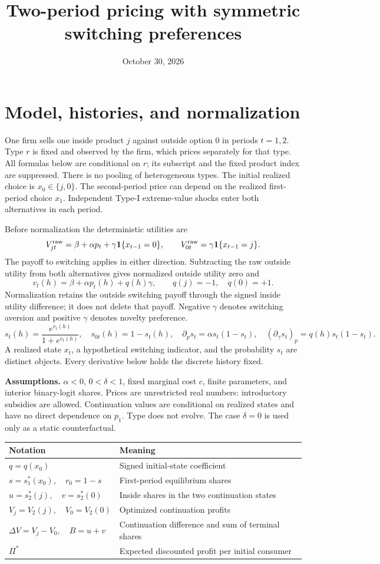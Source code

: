 \documentclass[11pt]{article}
\title{Two-period pricing with symmetric switching preferences}
\author{}\date{October 30, 2026}
\begin{document}
\maketitle
\section{Model, histories, and normalization}
One firm sells one inside product $j$ against outside option $0$ in periods
$t=1,2$. Type $r$ is fixed and observed by the firm, which prices separately for
that type. All formulas below are conditional on $r$; its subscript and the
fixed product index are suppressed. There is no pooling of heterogeneous types.
The initial realized choice is $x_0\in\{j,0\}$. The second-period price can depend
on the realized first-period choice $x_1$. Independent Type-I extreme-value
shocks enter both alternatives in each period.

Before normalization the deterministic utilities are
\[
 V_{jt}^{\rm raw}=\beta+\alpha p_t+\gamma\mathbf1\{x_{t-1}=0\},
 \qquad V_{0t}^{\rm raw}=\gamma\mathbf1\{x_{t-1}=j\}.
\]
The payoff to switching applies in either direction. Subtracting the raw outside
utility from both alternatives gives normalized outside utility zero and
\[
 v_t(h)=\beta+\alpha p_t(h)+q(h)\gamma,\qquad
 q(j)=-1,\quad q(0)=+1.
\]
Normalization retains the outside switching payoff through the signed inside
utility difference; it does not delete that payoff. Negative $\gamma$ denotes
switching aversion and positive $\gamma$ denotes novelty preference.
\[
 s_t(h)=\frac{e^{v_t(h)}}{1+e^{v_t(h)}},\quad s_{0t}(h)=1-s_t(h),\quad
 \partial_p s_t=\alpha s_t(1-s_t),\quad
 (\partial_\gamma s_t)_p=q(h)s_t(1-s_t).
\]
A realized state $x_t$, a hypothetical switching indicator, and the probability
$s_t$ are distinct objects. Every derivative below holds the discrete history fixed.

\textbf{Assumptions.} $\alpha<0$, $0<\delta<1$, fixed marginal cost $c$, finite
parameters, and interior binary-logit shares. Prices are unrestricted real
numbers: introductory subsidies are allowed. Continuation values are conditional
on realized states and have no direct dependence on $p_1$. Type does not evolve.
The case $\delta=0$ is used only as a static counterfactual.

\begin{center}\begin{tabular}{ll}\toprule
Notation & Meaning\\\midrule
$q=q(x_0)$ & Signed initial-state coefficient\\
$s=s_1^*(x_0),\quad r_0=1-s$ & First-period equilibrium shares\\
$u=s_2^*(j),\quad v=s_2^*(0)$ & Inside shares in the two continuation states\\
$V_j=V_2(j),\quad V_0=V_2(0)$ & Optimized continuation profits\\
$\Delta V=V_j-V_0,\quad B=u+v$ & Continuation difference and sum of terminal shares\\
$\Pi^*$ & Expected discounted profit per initial consumer\\\bottomrule
\end{tabular}\end{center}
\end{document}
